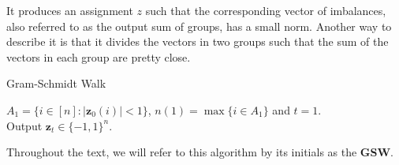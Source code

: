\documentclass[12pt]{article}
\begin{document}
It produces an assignment $z$ such that the corresponding vector of imbalances, also referred to as the output sum of groups, has a small norm. Another way to describe it is that it divides the vectors in two groups such that the sum of the vectors in each group are pretty close.

\begin{algorithm}[H]\label{walk}
{\fontsize{10}{12}
\caption{Gram-Schmidt Walk \cite{blues}}
   $A_1=\{i\in[n]:|\textbf{z}_0(i)|<1\}$, $n(1) = \max \{i \in A_1\}$ and $t=1$.\\
    Output $\textbf{z}_t\in\{-1,1\}^n$.
    }%
    \end{algorithm}
Throughout the text, we will refer to this algorithm by its initials as the \textbf{GSW}.%
\end{document}
